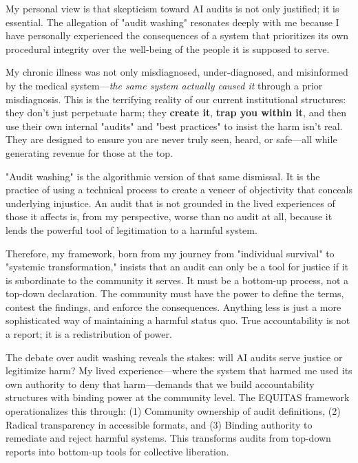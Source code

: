 \documentclass[12pt,letterpaper]{article}
\begin{document}
\begin{personalreflection}
My personal view is that skepticism toward AI audits is not only justified; it is essential. The allegation of "audit washing" resonates deeply with me because I have personally experienced the consequences of a system that prioritizes its own procedural integrity over the well-being of the people it is supposed to serve.

My chronic illness was not only misdiagnosed, under-diagnosed, and misinformed by the medical system—\textit{the same system actually caused it} through a prior misdiagnosis. This is the terrifying reality of our current institutional structures: they don't just perpetuate harm; they \textbf{create it}, \textbf{trap you within it}, and then use their own internal "audits" and "best practices" to insist the harm isn't real. They are designed to ensure you are never truly seen, heard, or safe—all while generating revenue for those at the top.

"Audit washing" is the algorithmic version of that same dismissal. It is the practice of using a technical process to create a veneer of objectivity that conceals underlying injustice. An audit that is not grounded in the lived experiences of those it affects is, from my perspective, worse than no audit at all, because it lends the powerful tool of legitimation to a harmful system.

Therefore, my framework, born from my journey from "individual survival" to "systemic transformation," insists that an audit can only be a tool for justice if it is subordinate to the community it serves. It must be a bottom-up process, not a top-down declaration. The community must have the power to define the terms, contest the findings, and enforce the consequences. Anything less is just a more sophisticated way of maintaining a harmful status quo. True accountability is not a report; it is a redistribution of power.
\end{personalreflection}

\begin{puzzleplan}
The debate over audit washing reveals the stakes: will AI audits serve justice or legitimize harm? My lived experience—where the system that harmed me used its own authority to deny that harm—demands that we build accountability structures with binding power at the community level. The EQUITAS framework operationalizes this through: (1) Community ownership of audit definitions, (2) Radical transparency in accessible formats, and (3) Binding authority to remediate and reject harmful systems. This transforms audits from top-down reports into bottom-up tools for collective liberation.
\end{puzzleplan}
\end{document}
